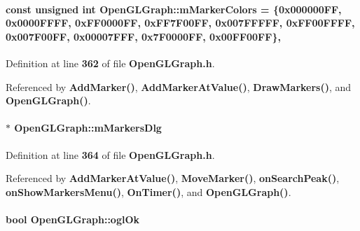 \paragraph[{m\+Marker\+Colors}]{\setlength{\rightskip}{0pt plus 5cm}const unsigned {\bf int} Open\+G\+L\+Graph\+::m\+Marker\+Colors = \{0x000000\+F\+F, 0x0000\+F\+F\+F\+F, 0x\+F\+F0000\+F\+F, 0x\+F\+F7\+F00\+F\+F, 0x007\+F\+F\+F\+F\+F, 0x\+F\+F00\+F\+F\+F\+F, 0x007\+F00\+F\+F, 0x00007\+F\+F\+F, 0x7\+F0000\+F\+F, 0x00\+F\+F00\+F\+F\}\hspace{0.3cm}{\ttfamily [static]}, {\ttfamily [private]}}\label{classOpenGLGraph_a6607ac27bfeedd062d69753c69dc863c}


Definition at line {\bf 362} of file {\bf Open\+G\+L\+Graph.\+h}.



Referenced by {\bf Add\+Marker()}, {\bf Add\+Marker\+At\+Value()}, {\bf Draw\+Markers()}, and {\bf Open\+G\+L\+Graph()}.

\paragraph[{m\+Markers\+Dlg}]{$\ast$ Open\+G\+L\+Graph\+::m\+Markers\+Dlg\hspace{0.3cm}{\ttfamily [private]}}\label{classOpenGLGraph_a8f83fe4c09f8d5bc1be71463848376ab}


Definition at line {\bf 364} of file {\bf Open\+G\+L\+Graph.\+h}.



Referenced by {\bf Add\+Marker\+At\+Value()}, {\bf Move\+Marker()}, {\bf on\+Search\+Peak()}, {\bf on\+Show\+Markers\+Menu()}, {\bf On\+Timer()}, and {\bf Open\+G\+L\+Graph()}.

\paragraph[{ogl\+Ok}]{\setlength{\rightskip}{0pt plus 5cm}bool Open\+G\+L\+Graph\+::ogl\+Ok\hspace{0.3cm}{\ttfamily [private]}}\label{classOpenGLGraph_a5323ae3a6699a1dbe494359a31428ecf}


